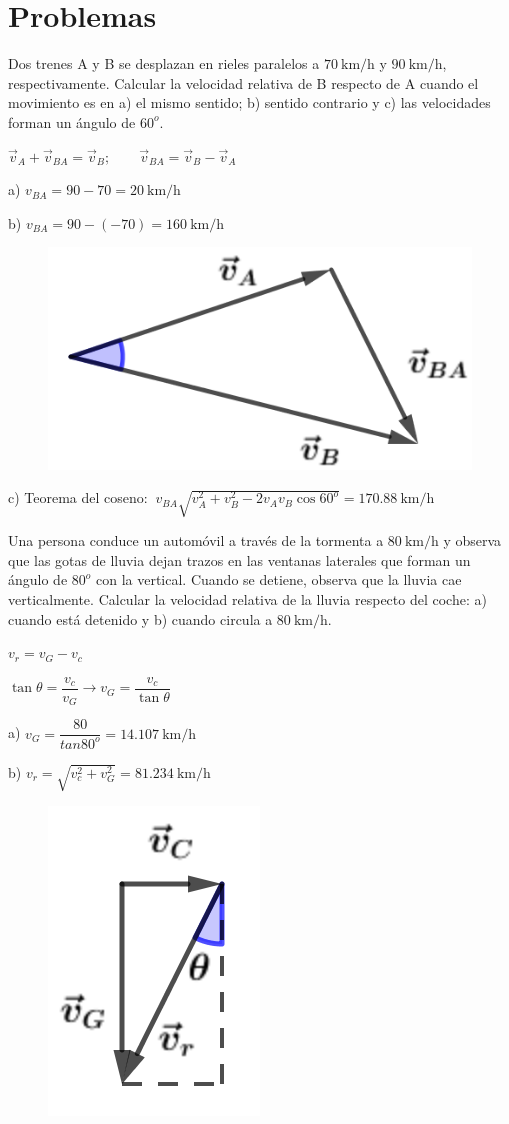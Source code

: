 \section{Problemas}
\begin{prob}
Dos trenes A y B se desplazan en rieles paralelos a $70\ \mathrm{km/h}$ y $90\ \mathrm{km/h}$, respectivamente. Calcular la velocidad relativa de B respecto de A cuando el movimiento es en a) el mismo sentido; b) sentido contrario y c) las velocidades forman un ángulo de $60^o$. 	
\end{prob}

\begin{multicols}{2}
	
	$\vec v_A+\vec v_{BA}=\vec v_B; \qquad \vec v_{BA}=\vec v_B-\vec v_A$
	
	a) $ v_{BA}=90-70=20\ \text{km/h}$
	
	b)  $ v_{BA}=90-(-70)=160\ \text{km/h}$
	\begin{figure}[H]
	\centering
	\includegraphics[width=.3\textwidth]{imagenes/imagenes10/T10IM06.png}
\end{figure}
\end{multicols}
c) Teorema del coseno: $\ v_{BA}\sqrt{v_A^2+v_B^2-2v_Av_B\cos 60^o}=170.88\ \text{km/h}$

\begin{prob}
Una persona conduce	un automóvil a través de la tormenta a $80\ \mathrm{km/h}$ y observa que las gotas de lluvia dejan trazos en las ventanas laterales que forman un ángulo de $80^o$ con la vertical. Cuando se detiene, observa que la lluvia cae verticalmente. Calcular la velocidad relativa de la lluvia respecto del coche: a) cuando está detenido y b) cuando circula a $80\ \mathrm{km/h}$.
\end{prob}

\begin{multicols}{2}
	$v_r=v_G-v_c$
	
	$\tan \theta=\dfrac {v_c}{v_G} \to v_G= \dfrac{v_c}{\tan \theta}$
	
	a) $v_G=\dfrac {80}{tan 80^o}=14.107\  \mathrm{km/h}$
	
	b) $v_r=\sqrt{v_c^2+v_G^2}=81.234\  \mathrm{km/h}$
	\begin{figure}[H]
	\centering
	\includegraphics[width=.2\textwidth]{imagenes/imagenes10/T10IM07.png}
\end{figure}
\end{multicols}

